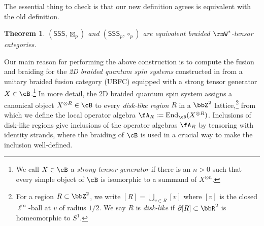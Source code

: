 \documentclass[11pt,reqno]{amsart}
\DeclareMathOperator{\End}{End}
\newcommand{\SSS}{\mathsf{SSS}}
\numberwithin{equation}{section}
\theoremstyle{plain}
\newtheorem{thmalpha}{Theorem}
\theoremstyle{definition}
\begin{document}
The essential thing to check is that our new definition agrees is equivalent with the old definition.

\begin{thmalpha} \label{thm:A}
    $(\SSS, \boxtimes_p)$ and $(\SSS_p, \circ_p)$ are equivalent braided $\rmW^*$-tensor categories.
\end{thmalpha}

Our main reason for performing the above construction is to compute the fusion and braiding for the \emph{2D braided quantum spin systems} constructed in \cite{2506.19969} from a unitary braided fusion category (UBFC) equipped with a strong tensor generator $X\in\cB$.\footnote{We call $X\in \cB$ a \emph{strong tensor generator} if there is an $n>0$ such that every simple object of $\cB$ is isomorphic to a summand of $X^{\otimes n}$.}
In more detail, the 2D braided quantum spin system assigns 
a canonical object $X^{\otimes R}\in \cB$ to every \emph{disk-like region} $R$ in a $\bbZ^2$ lattice,\footnote{For a region $R\subset \bbZ^2$, we write $[R]=\bigcup_{v\in R} [v]$ where $[v]$ is the closed $\ell^\infty$-ball at $v$ of radius $1/2$.
We say $R$ is \emph{disk-like} if $\partial[R]\subset \bbR^2$ is homeomorphic to $S^1$.}
from which we define the local operator algebra
$\fA_R:=\End_\cB(X^{\otimes R})$.
Inclusions of disk-like regions give inclusions of the operator algebras $\fA_R$ by tensoring with identity strands, where the braiding of $\cB$ is used in a crucial way to make the inclusion well-defined.
\end{document}
